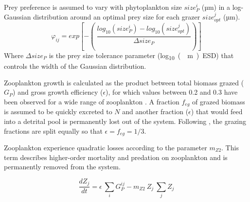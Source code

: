 \documentclass[journal abbreviation, manuscript]{copernicus}
\begin{document}
Prey preference is assumed to vary with phytoplankton size $size_{P}^i$ (\unit{µm}) in a log-Gaussian distribution around an optimal prey size for each grazer $size_{opt}^j$ (\unit{µm}).
\begin{equation}
    \varphi_{ij} = exp \left[ -\left( \ \frac{ log_{10}(size_P^i) - log_{10}(size_{opt}^j) }{ \Delta size_{P} } \right) \right]
\end{equation}
Where $\Delta size_{P}$ is the prey size tolerance parameter (\unit{log_{10}(\mu m) ESD}) that controls the width of the Gaussian distribution.

Zooplankton growth is calculated as the product between total biomass grazed ($G_P$) and gross growth efficiency ($\epsilon$), for which values between 0.2 and 0.3 have been observed for a wide range of zooplankton \citep{Straile1997GrossGroup}. A fraction $f_{eg}$ of grazed biomass is assumed to be quickly excreted to $N$ and another fraction ($\epsilon$) that would feed into a detrital pool is permanently lost out of the system. Following \citet{Banas2011b}, the grazing fractions are split equally so that $\epsilon = f_{eg} = 1/3$.

Zooplankton experience quadratic losses according to the parameter $m_{Z2}$. This term describes higher-order mortality and predation on zooplankton and is permanently removed from the system.

\begin{equation}
    \frac{d Z_j}{d t} =
    \epsilon \ \sum_{i} G_P^{ij} %
    - m_{Z2} \ Z_j \ \sum_{j} Z_j  %
\end{equation}
\end{document}
